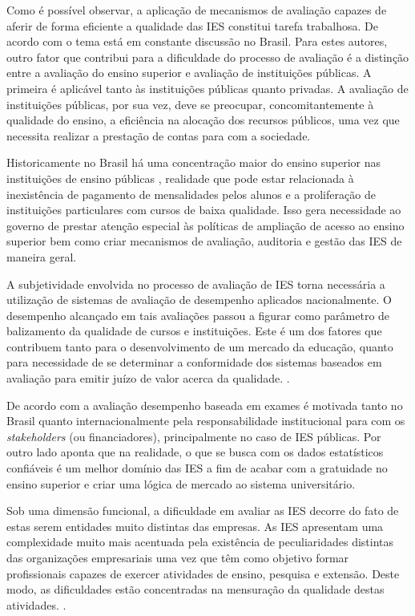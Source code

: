 Como é possível observar, a aplicação de mecanismos de avaliação capazes de aferir de forma eficiente a qualidade das IES constitui tarefa trabalhosa. De acordo com  o tema está em constante discussão no Brasil. Para estes autores, outro fator que contribui para a dificuldade do processo de avaliação é a distinção entre a avaliação do ensino superior e avaliação de instituições públicas. A primeira é aplicável tanto às instituições públicas quanto privadas. A avaliação de instituições públicas, por sua vez, deve se preocupar, concomitantemente à qualidade do ensino, a eficiência na alocação dos recursos públicos, uma vez que necessita realizar a prestação de contas para com a sociedade. 

Historicamente no Brasil há uma concentração maior do ensino superior nas instituições de ensino públicas \cite{Barbosa_Freire_Crisostomo_2011}, realidade que pode estar relacionada à inexistência de pagamento de mensalidades pelos alunos e a proliferação de instituições particulares com cursos de baixa qualidade. Isso gera necessidade ao governo de prestar atenção especial às políticas de ampliação de acesso ao ensino superior bem como criar mecanismos de avaliação, auditoria e gestão das IES de maneira geral.

A subjetividade envolvida no processo de avaliação de IES torna necessária a utilização de sistemas de avaliação de desempenho aplicados nacionalmente. 
O desempenho alcançado em tais avaliações passou a figurar como parâmetro de balizamento da qualidade de cursos e instituições. Este é um dos fatores que contribuem tanto para o desenvolvimento de um mercado da educação, quanto para necessidade de se determinar a conformidade dos sistemas baseados em avaliação para emitir juízo de valor acerca da qualidade. \cite[p.~108]{Bertolin_Marcon_2015}.

De acordo com  a avaliação desempenho baseada em exames é motivada tanto no Brasil quanto internacionalmente pela responsabilidade institucional para com os \textit{stakeholders} (ou financiadores), principalmente no caso de IES públicas. Por outro lado  aponta que na realidade, o que se busca com os dados estatísticos confiáveis é um melhor domínio das IES a fim de acabar com a gratuidade no ensino superior e criar uma lógica de mercado ao sistema universitário.

Sob uma dimensão funcional, a dificuldade em avaliar as IES decorre do fato de estas serem entidades muito distintas das empresas. As IES apresentam uma complexidade muito mais acentuada pela existência de peculiaridades distintas das organizações empresariais uma vez que têm como objetivo formar profissionais capazes de exercer atividades de ensino, pesquisa e extensão. Deste modo, as dificuldades estão concentradas na mensuração da qualidade destas atividades. \cite[p.~318]{Barbosa_Freire_Crisostomo_2011}.

